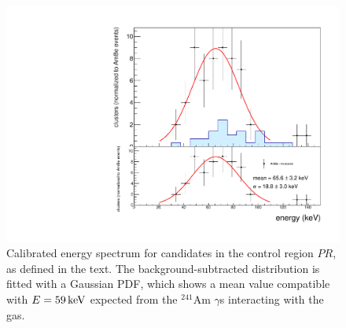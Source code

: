\begin{figure}[ht]
  \begin{center}
  \includegraphics[width=0.60\linewidth]{figures/calintegral_59keV}

  \caption{Calibrated energy spectrum for candidates in the control
    region $PR$, as defined in the text. The background-subtracted
    distribution is fitted with a Gaussian PDF, which shows a mean
    value compatible with $E=59\,\textrm{ke\hspace{-.08em}V}$ expected from the $^{241}$Am
    $\gamma$s interacting with the gas. \label{fig:59keV}}

  \end{center}
\end{figure}

